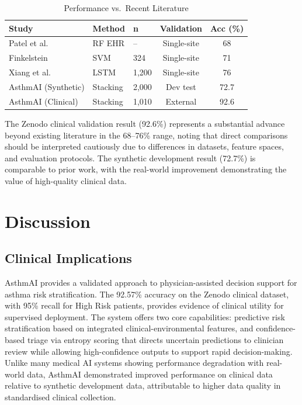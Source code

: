 \documentclass[11pt,a4paper]{article}
\begin{document}
\begin{table}[H]
\centering
\caption{Performance vs.\ Recent Literature}
\label{tab:sota}
\begin{tabular}{lllcc}
\toprule
\textbf{Study} & \textbf{Method} & \textbf{n} & \textbf{Validation} & \textbf{Acc (\%)} \\
\midrule
Patel et al.\ \cite{patel2019}        & RF EHR    & --    & Single-site & 68   \\
Finkelstein \cite{finkelstein2017}     & SVM       & 324   & Single-site & 71   \\
Xiang et al.\ \cite{xiang2020}        & LSTM      & 1,200 & Single-site & 76   \\
AsthmAI (Synthetic)                   & Stacking  & 2,000 & Dev test    & 72.7 \\
AsthmAI (Clinical)                    & Stacking  & 1,010 & External    & 92.6 \\
\bottomrule
\end{tabular}
\end{table}

The Zenodo clinical validation result (92.6\%) represents a substantial advance beyond
existing literature in the 68--76\% range, noting that direct comparisons should be
interpreted cautiously due to differences in datasets, feature spaces, and evaluation
protocols. The synthetic development result (72.7\%) is comparable to prior work,
with the real-world improvement demonstrating the value of high-quality clinical data.

\section{Discussion}

\subsection{Clinical Implications}

AsthmAI provides a validated approach to physician-assisted decision support for asthma
risk stratification. The 92.57\% accuracy on the Zenodo clinical dataset, with 95\%
recall for High Risk patients, provides evidence of clinical utility for supervised
deployment. The system offers two core capabilities: predictive risk stratification
based on integrated clinical-environmental features, and confidence-based triage via
entropy scoring that directs uncertain predictions to clinician review while allowing
high-confidence outputs to support rapid decision-making. Unlike many medical AI systems
showing performance degradation with real-world data, AsthmAI demonstrated improved
performance on clinical data relative to synthetic development data, attributable to
higher data quality in standardised clinical collection.
\end{document}
